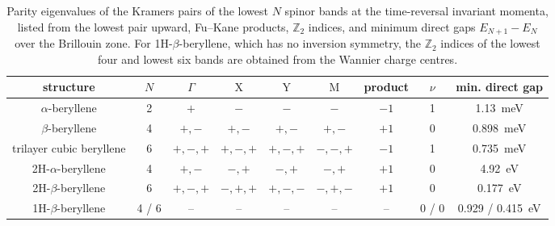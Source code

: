 \begin{table}[!htbp]
\centering
{}
\setlength{\tabcolsep}{8pt}
\begin{adjustbox}{max width=1.0\linewidth,center}
\begin{tabular}{ccccccccc}
\hline
\rowcolor{gray!25}
structure
& $N$
& $\Gamma$
& $\mathrm{X}$
& $\mathrm{Y}$
& $\mathrm{M}$
& product
& $\nu$
& min. direct gap \\
\hline
$\alpha$-beryllene
& 2
& $+$
& $-$
& $-$
& $-$
& $-1$
& 1
& \qty{1.13}{\milli\electronvolt} \\
$\beta$-beryllene
& 4
& $+, -$
& $+, -$
& $+, -$
& $+, -$
& $+1$
& 0
& \qty{0.898}{\milli\electronvolt} \\
trilayer cubic beryllene
& 6
& $+, -, +$
& $+, -, +$
& $+, -, +$
& $-, -, +$
& $-1$
& 1
& \qty{0.735}{\milli\electronvolt} \\
2H-$\alpha$-beryllene
& 4
& $+, -$
& $-, +$
& $-, +$
& $-, +$
& $+1$
& 0
& \qty{4.92}{\electronvolt} \\
2H-$\beta$-beryllene
& 6
& $+, -, +$
& $-, +, +$
& $+, -, -$
& $-, +, -$
& $+1$
& 0
& \qty{0.177}{\electronvolt} \\
1H-$\beta$-beryllene
& 4 / 6
& --
& --
& --
& --
& --
& 0 / 0
& 0.929 / \qty{0.415}{\electronvolt} \\
\hline
\end{tabular}
\end{adjustbox}
\caption{Parity eigenvalues of the Kramers pairs of the lowest $N$ spinor bands at the time-reversal invariant momenta,
listed from the lowest pair upward,
Fu--Kane products,
$\mathbb{Z}_2$ indices,
and minimum direct gaps $E_{N+1}-E_{N}$ over the Brillouin zone.
For 1H-$\beta$-beryllene,
which has no inversion symmetry,
the $\mathbb{Z}_2$ indices of the lowest four and lowest six bands are obtained from the Wannier charge centres.}
\label{tab:proj3_topological_parity}
\end{table}

